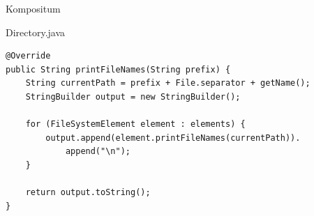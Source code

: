 \begin{frame}[fragile]{Kompositum}
	\begin{exampleblock}{Directory.java}
        \begin{lstlisting}
@Override
public String printFileNames(String prefix) {
    String currentPath = prefix + File.separator + getName();
    StringBuilder output = new StringBuilder();
    
    for (FileSystemElement element : elements) {
        output.append(element.printFileNames(currentPath)).
            append("\n");
    }
    
    return output.toString();
}
        \end{lstlisting}
 	\end{exampleblock}
\end{frame}
